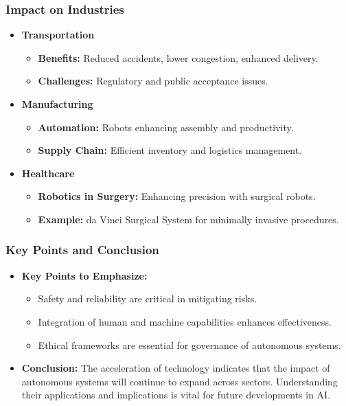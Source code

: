 \documentclass[aspectratio=169]{beamer}
\begin{document}
\begin{frame}[fragile]
    \frametitle{Impact on Industries}
    \begin{itemize}
        \item \textbf{Transportation}
        \begin{itemize}
            \item \textbf{Benefits:} Reduced accidents, lower congestion, enhanced delivery.
            \item \textbf{Challenges:} Regulatory and public acceptance issues.
        \end{itemize}
        
        \item \textbf{Manufacturing}
        \begin{itemize}
            \item \textbf{Automation:} Robots enhancing assembly and productivity.
            \item \textbf{Supply Chain:} Efficient inventory and logistics management.
        \end{itemize}

        \item \textbf{Healthcare}
        \begin{itemize}
            \item \textbf{Robotics in Surgery:} Enhancing precision with surgical robots.
            \item \textbf{Example:} da Vinci Surgical System for minimally invasive procedures.
        \end{itemize}
    \end{itemize}
\end{frame}

\begin{frame}[fragile]
    \frametitle{Key Points and Conclusion}
    \begin{itemize}
        \item \textbf{Key Points to Emphasize:}
        \begin{itemize}
            \item Safety and reliability are critical in mitigating risks.
            \item Integration of human and machine capabilities enhances effectiveness.
            \item Ethical frameworks are essential for governance of autonomous systems.
        \end{itemize}

        \item \textbf{Conclusion:} The acceleration of technology indicates that the impact of autonomous systems will continue to expand across sectors. Understanding their applications and implications is vital for future developments in AI.
    \end{itemize}
\end{frame}
\end{document}
